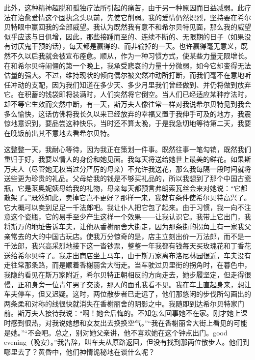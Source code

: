 \par 此外，这种精神超脱和孤独疗法所引起的痛苦，由于另一种原因而日益减弱。此疗法在治愈爱情这个固执念头以前，先使它削弱。我的爱情仍然炽烈，坚持要在希尔贝特眼中赢回我的全部威望。我认为既然我有意不和希尔贝特见面，那么我的威望似乎应该与日俱增，因此，那些接踵而至的、连续不断的、无限期的日子（如果没有讨厌鬼干预的话），每天都是赢得的、而非输掉的一天。也许赢得毫无意义，既然不久以后我就会被宣布痊愈。顺从，作为一种习惯方式，使某些力量无限增长。在和希尔贝特闹僵的第一个晚上，我承受悲哀的力量十分微弱，如今它却变得无法估量的强大。不过，维持现状的倾向偶尔被突然冲动所打断，而我们毫不在意地听任冲动的支配，因为我们知道在多少天、多少月里我们曾经做到、并仍将做到放弃它。在积蓄的钱袋即将装满时，人们突然将它倒空。当人们已经适应某种疗法时，却不等它生效而突然中断，有一天，斯万夫人像往常一样对我说希尔贝特见到我会多么愉快，这话仿佛将我长久以来已经放弃的幸福又置于我伸手可及的地方，我震惊地意识到，要品尝这种快乐，当时还不算太晚，于是我急切地等待第二天，我要在晚饭前出其不意地去看希尔贝特。
\par 这整整一天，我耐心等待，因为我正在策划一件事。既然往事一笔勾销，既然我们重归于好，我要以情人的身份和她见面。我每天将送给她世上最美的鲜花。如果斯万夫人（尽管她无权当过分严厉的母亲）不允许我送花，那么我每隔一段时间就将送些更为珍贵的礼品。父母给我的钱是不够买礼品的，所以我想到了那个中国古瓷瓶，它是莱奥妮姨母给我的礼物，母亲每天都预言弗朗索瓦丝会来对她说：“它都散架了。”既然如此，卖掉它岂不更好？那样一来，我就有条件使希尔贝特高兴了。它大概可以卖到足足一千法郎吧。我让仆人把它包了起来。由于习惯，我一向不注意这个瓷瓶，它的易手至少产生这样一个效果——让我认识它。我带上它出门，我将斯万的地址告诉车夫，让他从香榭丽舍大街走，因为那条街的拐角上有一家我父亲常去的大的中国古玩店。使我万分惊奇的是，店主立刻出价一万法郎，而不是一千法郎，我兴高采烈地接下这一沓钞票，整整一年我都有钱每天买玫瑰花和丁香花送给希尔贝特了。我走出商店坐上马车，由于斯万家离布洛尼林园很近，车夫没有走往常那条路，而是顺着香榭丽舍大街走。当车驶过贝里街的拐角时，在暮色中，我隐约看见在斯万家附近，希尔贝特正朝相反的方向走去，她步履坚定，但走得很慢，正和身旁一位青年男子交谈，那人的面孔我看不见。我在车上直起身来，想让车夫停车，但又迟疑。这时，两位散步者已走远了，他们那悠闲的步伐所勾画出的两条柔和对称的线很快就消失在香榭丽舍的阴影之中。我随即到达希尔贝特家门前。斯万夫人接待我说：“啊！她会后悔的。不知怎么回事她不在家。刚才她上课时感到很热，对我说她想和女友出去换换空气。”“我在香榭丽舍大街上看见的可能是她。”“不会吧。总之，别对她父亲讲，他不喜欢她在这个钟点出门。good evening（晚安）。”我告辞，叫车夫从原路返回，但没有找到那两位散步人。他们到哪里去了？黄昏中，他们神情诡秘地在谈什么呢？
